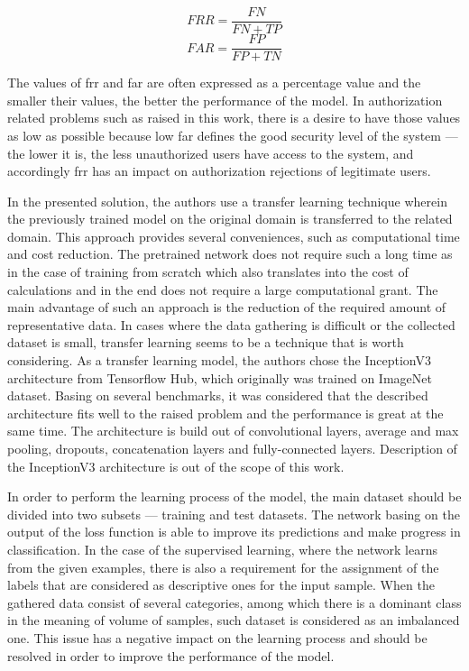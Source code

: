 \begin{equation}
    FRR = \frac{FN}{FN + TP}\label{eq:frr}
\end{equation}
\begin{equation}
    FAR = \frac{FP}{FP + TN}\label{eq:far}
\end{equation}

The values of \gls{frr} and \gls{far} are often expressed as a percentage value and the smaller their values, the better the performance of the model.
In authorization related problems such as raised in this work, there is a desire to have those values as low as possible because low \gls{far} defines the good security level of the system --- the lower it is, the less unauthorized users have access to the system, and accordingly \gls{frr} has an impact on authorization rejections of legitimate users.

In the presented solution, the authors use a transfer learning technique wherein the previously trained model on the original domain is transferred to the related domain.
This approach provides several conveniences, such as computational time and cost reduction.
The pretrained network does not require such a long time as in the case of training from scratch which also translates into the cost of calculations and in the end does not require a large computational grant.
The main advantage of such an approach is the reduction of the required amount of representative data.
In cases where the data gathering is difficult or the collected dataset is small, transfer learning seems to be a technique that is worth considering.
As a transfer learning model, the authors chose the InceptionV3 architecture from Tensorflow Hub, which originally was trained on ImageNet dataset.
Basing on several benchmarks, it was considered that the described architecture fits well to the raised problem and the performance is great at the same time.
The architecture is build out of convolutional layers, average and max pooling, dropouts, concatenation layers and fully-connected layers.
Description of the InceptionV3 architecture is out of the scope of this work.

In order to perform the learning process of the model, the main dataset should be divided into two subsets --- training and test datasets.
The network basing on the output of the loss function is able to improve its predictions and make progress in classification.
In the case of the supervised learning, where the network learns from the given examples, there is also a requirement for the assignment of the labels that are considered as descriptive ones for the input sample.
When the gathered data consist of several categories, among which there is a dominant class in the meaning of volume of samples, such dataset is considered as an imbalanced one.
This issue has a negative impact on the learning process and should be resolved in order to improve the performance of the model.
